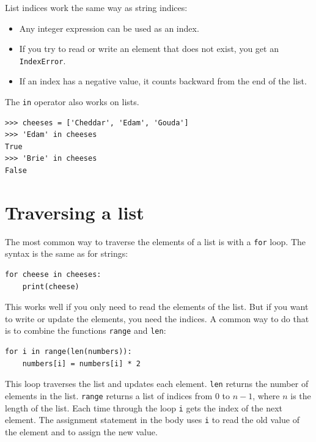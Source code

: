 \documentclass[10pt]{book}
\begin{document}
List indices work the same way as string indices:

\begin{itemize}

\item Any integer expression can be used as an index.

\item If you try to read or write an element that does not exist, you
get an {\tt IndexError}.


\item If an index has a negative value, it counts backward from the
end of the list.

\end{itemize}




The {\tt in} operator also works on lists.

\beforeverb
\begin{verbatim}
>>> cheeses = ['Cheddar', 'Edam', 'Gouda']
>>> 'Edam' in cheeses
True
>>> 'Brie' in cheeses
False
\end{verbatim}
\afterverb


\section{Traversing a list}

The most common way to traverse the elements of a list is
with a {\tt for} loop.  The syntax is the same as for strings:

\beforeverb
\begin{verbatim}
for cheese in cheeses:
    print(cheese)
\end{verbatim}
\afterverb
%
This works well if you only need to read the elements of the
list.  But if you want to write or update the elements, you
need the indices.  A common way to do that is to combine
the functions {\tt range} and {\tt len}:


\beforeverb
\begin{verbatim}
for i in range(len(numbers)):
    numbers[i] = numbers[i] * 2
\end{verbatim}
\afterverb
%
This loop traverses the list and updates each element.  {\tt len}
returns the number of elements in the list.  {\tt range} returns
a list of indices from 0 to $n-1$, where $n$ is the length of
the list.  Each time through the loop {\tt i} gets the index
of the next element.  The assignment statement in the body uses
{\tt i} to read the old value of the element and to assign the
new value.
\end{document}
